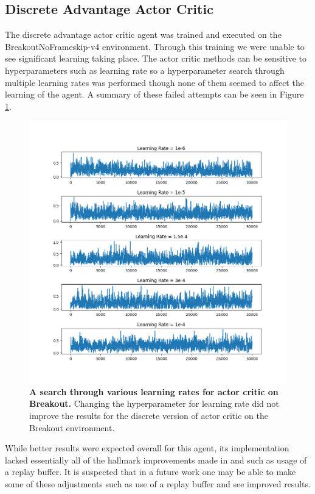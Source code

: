 \documentclass[conference]{IEEEtran}
\begin{document}
\subsection{Discrete Advantage Actor Critic}
The discrete advantage actor critic agent was trained and executed on the BreakoutNoFrameskip-v4 environment.
Through this training we were unable to see significant learning taking place.
The actor critic methods can be sensitive to hyperparameters such as learning rate so a hyperparameter search through multiple learning rates was performed though none of them seemed to affect the learning of the agent.
A summary of these failed attempts can be seen in Figure \ref{fig:actorCriticLearningRateSearch}.

\begin{figure}[htbp]
\centerline{\includegraphics[scale=0.4]{actor_critic_breakout_lr_search.png}}
\caption{\textbf{A search through various learning rates for actor critic on Breakout.}  Changing the hyperparameter for learning rate did not improve the results for the discrete version of actor critic on the Breakout environment.}
\label{fig:actorCriticLearningRateSearch}
\end{figure}

While better results were expected overall for this agent, its implementation lacked essentially all of the hallmark improvements made in \cite{DQNOriginalPaper} and \cite{NatureDeepLearning} such as usage of a replay buffer.
It is suspected that in a future work one may be able to make some of these adjustments such as use of a replay buffer and see improved results.
\end{document}
